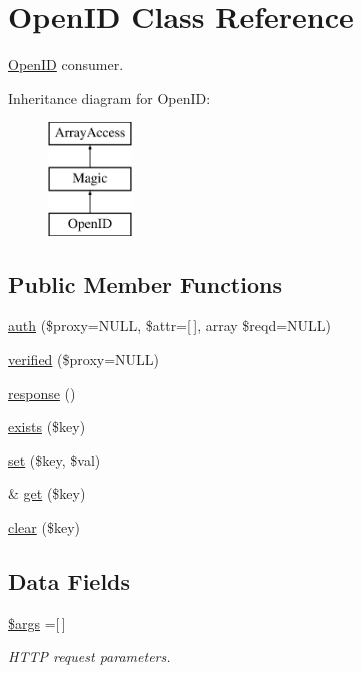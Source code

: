 \hypertarget{class_web_1_1_open_i_d}{}\section{Open\+ID Class Reference}
\label{class_web_1_1_open_i_d}


\hyperlink{class_web_1_1_open_i_d}{Open\+ID} consumer.  


Inheritance diagram for Open\+ID\+:\begin{figure}[H]
\begin{center}
\leavevmode
\includegraphics[height=3.000000cm]{class_web_1_1_open_i_d}
\end{center}
\end{figure}
\subsection*{Public Member Functions}
\begin{DoxyCompactItemize}
\item 
\hyperlink{class_web_1_1_open_i_d_a83c8bf3d9d47536f727fce44c00de4f0}{auth} (\$proxy=N\+U\+LL, \$attr=\mbox{[}$\,$\mbox{]}, array \$reqd=N\+U\+LL)
\item 
\hyperlink{class_web_1_1_open_i_d_a5d29540442d0e302ca0916620ad2bc17}{verified} (\$proxy=N\+U\+LL)
\item 
\hyperlink{class_web_1_1_open_i_d_a1e3f1bea94184e9ba901797124266e96}{response} ()
\item 
\hyperlink{class_web_1_1_open_i_d_ace1ae5be37bf26c172cc7ea4e1a65e26}{exists} (\$key)
\item 
\hyperlink{class_web_1_1_open_i_d_ac8d8012023e560c81f55a629022cb65a}{set} (\$key, \$val)
\item 
\& \hyperlink{class_web_1_1_open_i_d_ac3695923790b06917410e205068b8376}{get} (\$key)
\item 
\hyperlink{class_web_1_1_open_i_d_a10a949ef75de6c82c98ac555f371ba83}{clear} (\$key)
\end{DoxyCompactItemize}
\subsection*{Data Fields}
\begin{DoxyCompactItemize}
\item 
\hypertarget{class_web_1_1_open_i_d_a67e94494731d99ed23b123e95175bc10}{}\label{class_web_1_1_open_i_d_a67e94494731d99ed23b123e95175bc10} 
\hyperlink{class_web_1_1_open_i_d_a67e94494731d99ed23b123e95175bc10}{\$args} =\mbox{[}$\,$\mbox{]}
\begin{DoxyCompactList}\small\item\em H\+T\+TP request parameters. \end{DoxyCompactList}\end{DoxyCompactItemize}
